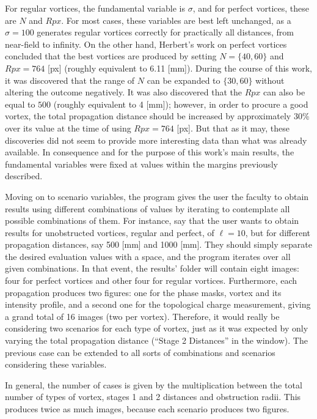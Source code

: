 For regular vortices, the fundamental variable is $\sigma$, and for perfect vortices, these are $N$ and $Rpx$. For most cases, these variables are best left unchanged, as a $\sigma = 100$ generates regular vortices correctly for practically all distances, from near-field to infinity. On the other hand, Herbert's work on perfect vortices concluded that the best vortices are produced by setting $N = \{40,60\}$ and $Rpx = 764$ [px] (roughly equivalent to 6.11 [mm]). During the course of this work, it was discovered that the range of $N$ can be expanded to $\{30,60\}$ without altering the outcome negatively. It was also discovered that the $Rpx$ can also be equal to $500$ (roughly equivalent to 4 [mm]); however, in order to procure a good vortex, the total propagation distance should be increased by approximately 30\% over its value at the time of using $Rpx = 764$ [px]. But that as it may, these discoveries did not seem to provide more interesting data than what was already available. In consequence and for the purpose of this work's main results, the fundamental variables were fixed at values within the margins previously described.

Moving on to scenario variables, the program gives the user the faculty to obtain results using different combinations of values by iterating to contemplate all possible combinations of them. For instance, say that the user wants to obtain results for unobstructed vortices, regular and perfect, of $\ell = 10$, but for different propagation distances, say 500 [mm] and 1000 [mm]. They should simply separate the desired evaluation values with a space, and the program iterates over all given combinations. In that event, the results' folder will contain eight images: four for perfect vortices and other four for regular vortices. Furthermore, each propagation produces two figures: one for the phase masks, vortex and its intensity profile, and a second one for the topological charge measurement, giving a grand total of 16 images (two per vortex). Therefore, it would really be considering two scenarios for each type of vortex, just as it was expected by only varying the total propagation distance (``Stage 2 Distances'' in the window). The previous case can be extended to all sorts of combinations and scenarios considering these variables.

In general, the number of cases is given by the multiplication between the total number of types of vortex, stages 1 and 2 distances and obstruction radii. This produces twice as much images, because each scenario produces two figures.

